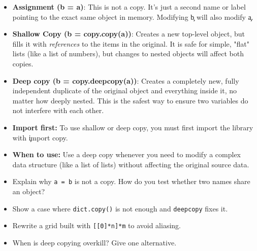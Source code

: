 \begin{tcolorbox}[
    colframe=orange,
    colback=white,
    arc=2mm
]
\begin{itemize}
    \item \textbf{Assignment ({b = a})}: This is not a copy. It's just a second name or label pointing to the exact same object in memory. Modifying \c{b} will also modify \c{a}.
    \item \textbf{Shallow Copy ({b = copy.copy(a)})}: Creates a new top-level object, but fills it with \emph{references} to the items in the original. It is safe for simple, "flat" lists (like a list of numbers), but changes to nested objects will affect both copies.
    \item \textbf{Deep copy ({b = copy.deepcopy(a)})}: Creates a completely new, fully independent duplicate of the original object and everything inside it, no matter how deeply nested. This is the safest way to ensure two variables do not interfere with each other.
    \item \textbf{Import first:} To use shallow or deep copy, you must first import the library with \c{import copy}.
    \item \textbf{When to use:} Use a deep copy whenever you need to modify a complex data structure (like a list of lists) without affecting the original source data.
\end{itemize}
\end{tcolorbox}

\begin{itemize}
  \item Explain why \texttt{a = b} is not a copy. How do you test whether two names share an object?
  \item Show a case where \texttt{dict.copy()} is not enough and \texttt{deepcopy} fixes it.
  \item Rewrite a grid built with \texttt{[[0]*n]*m} to avoid aliasing.
  \item When is deep copying overkill? Give one alternative.
\end{itemize}
